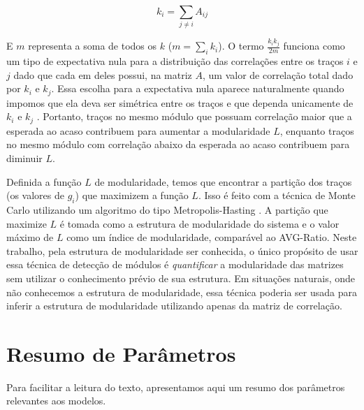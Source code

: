 \begin{equation}
   k_i = \sum_{j \neq i} A_{ij}
\end{equation}

E $m$ representa a soma de todos os $k$ ($m=\sum_i k_i$). 
O termo $\frac{k_ik_j}{2m}$ funciona como um tipo de expectativa nula
para a distribuição das correlações entre os traços $i$ e $j$ dado que
cada em deles possui, na matriz $A$, um valor de correlação total
dado por $k_i$ e $k_j$.
Essa escolha para a expectativa nula aparece naturalmente quando
impomos que ela deva ser simétrica entre os traços e que dependa
unicamente de $k_i$ e $k_j$ \citep[Para detalhes veja][]{Newman2006a}.
Portanto, traços no mesmo módulo que possuam correlação maior que a
esperada ao acaso contribuem para aumentar a modularidade $L$, enquanto
traços no mesmo módulo com correlação abaixo da esperada ao acaso
contribuem para diminuir $L$.

Definida a função $L$ de modularidade, temos que encontrar a partição
dos traços (os valores de $g_i$) que maximizem a função $L$. 
Isso é feito com a técnica de Monte Carlo utilizando um algoritmo
do tipo Metropolis-Hasting \citep{Metropolis1953}.
A partição que maximize $L$ é tomada como a estrutura de modularidade do
sistema e o valor máximo de $L$ como um índice de modularidade,
comparável ao AVG-Ratio. 
Neste trabalho, pela estrutura de modularidade ser conhecida, o único propósito 
de usar essa técnica de detecção de módulos é {\it quantificar} a 
modularidade das matrizes sem utilizar o conhecimento prévio de sua
estrutura.
Em situações naturais, onde não conhecemos a estrutura de modularidade,
essa técnica poderia ser usada para inferir a estrutura de modularidade
utilizando apenas da matriz de correlação.

\section{Resumo de Parâmetros}

Para facilitar a leitura do texto, apresentamos aqui um resumo dos
parâmetros relevantes aos modelos.

